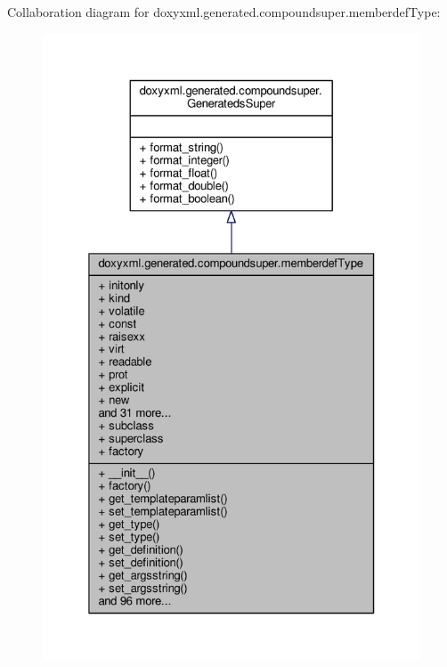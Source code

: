 Collaboration diagram for doxyxml.\+generated.\+compoundsuper.\+memberdef\+Type\+:
\nopagebreak
\begin{figure}[H]
\begin{center}
\leavevmode
\includegraphics[width=325pt]{dd/d7a/classdoxyxml_1_1generated_1_1compoundsuper_1_1memberdefType__coll__graph}
\end{center}
\end{figure}
